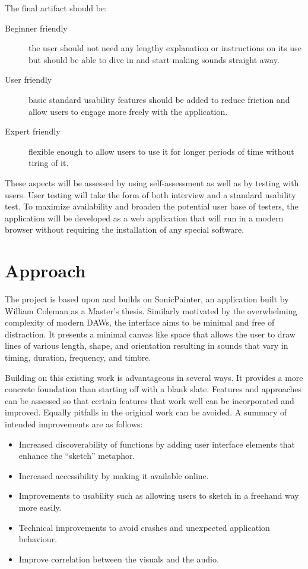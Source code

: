 \documentclass[12pt]{report}
\begin{document}
The final artifact should be:
\begin{description}
\item[{Beginner friendly}] the user should not need any lengthy explanation or
instructions on its use but should be able to dive in and start making
sounds straight away.
\item[{User friendly}] basic standard usability features should be added to reduce
friction and allow users to engage more freely with the
application.
\item[{Expert friendly}] flexible enough to allow users to use it for longer periods
of time without tiring of it.
\end{description}

These aspects will be assessed by using self-assessment as well as by testing
with users. User testing will take the form of both interview and a standard
usability test. To maximize availability and broaden the potential user base of
testers, the application will be developed as a web application that will run in
a modern browser without requiring the installation of any special software.

\chapter{Approach}
\label{sec:orgdad0e00}
The project is based upon and builds on SonicPainter, an application built by
William Coleman as a Master's thesis. Similarly motivated by the overwhelming
complexity of modern DAWs, the interface aims to be minimal and free of
distraction. It presents a minimal canvas like space that allows the user to
draw lines of various length, shape, and orientation resulting in sounds that
vary in timing, duration, frequency, and timbre.

Building on this existing work is advantageous in several ways. It provides a
more concrete foundation than starting off with a blank slate. Features and
approaches can be assessed so that certain features that work well can be
incorporated and improved. Equally pitfalls in the original work can be avoided.
A summary of intended improvements are as follows:
\begin{itemize}
\item Increased discoverability of functions by adding user interface elements that
enhance the ``sketch'' metaphor.
\item Increased accessibility by making it available online.
\item Improvements to usability such as allowing users to sketch in a freehand way
more easily.
\item Technical improvements to avoid crashes and unexpected application behaviour.
\item Improve correlation between the visuals and the audio.
\end{itemize}
\end{document}
